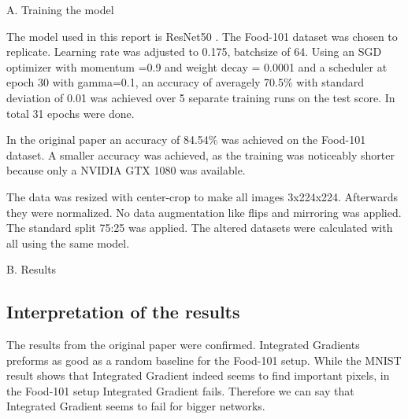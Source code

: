 A. Training the model

The model used in this report is ResNet50 \cite{he2015deep}. The Food-101 \cite{bossard14} dataset was chosen to replicate. Learning rate was adjusted to 0.175, batchsize of 64. Using an SGD optimizer with momentum =0.9 and weight decay = 0.0001 and a scheduler at epoch 30 with gamma=0.1, an accuracy of averagely 70.5\% with standard deviation of 0.01  was achieved over 5 separate training runs on the test score. In total 31 epochs were done. 

In the original paper an accuracy of 84.54\% was achieved on the Food-101 dataset.  A smaller accuracy was achieved, as the training was noticeably shorter because only a NVIDIA GTX 1080 was available.

The data was resized with center-crop to make all images 3x224x224. Afterwards they were normalized. No data augmentation like flips and mirroring was applied. The standard split 75:25 was applied. The altered datasets were calculated with all using the same model.

B. Results



\subsection{Interpretation of the results}

The results from the original paper were confirmed. Integrated Gradients preforms as good as a random baseline for the Food-101 setup. While the MNIST result shows that Integrated Gradient indeed seems to find important pixels, in the Food-101 setup Integrated Gradient fails. Therefore we can say that Integrated Gradient seems to fail for bigger networks.






